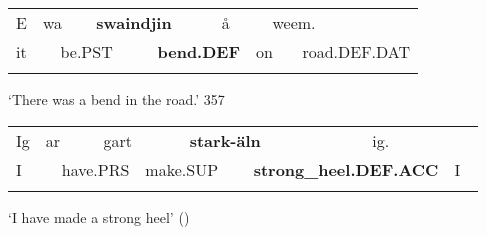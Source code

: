 \begin{tabular}{llllllllll}
\lsptoprule
E & \multicolumn{2}{l}{wa

} & \multicolumn{2}{l}{{\bfseries swaindjin}

} & \multicolumn{2}{l}{å

} & \multicolumn{2}{l}{weem.

} & \\
\multicolumn{2}{l}{it

} & \multicolumn{2}{l}{be.PST

} & \multicolumn{2}{l}{{\bfseries bend.DEF}

} & \multicolumn{2}{l}{on

} & \multicolumn{2}{l}{road.DEF.DAT

}\\
\lspbottomrule
\end{tabular}

\begin{styleTranslation}
‘There was a bend in the road.’ 357

\end{styleTranslation}


\begin{listWWNumileveli}
\item 

\end{listWWNumileveli}

\begin{tabular}{llllllllll}
\lsptoprule
Ig & \multicolumn{2}{l}{ar

} & \multicolumn{2}{l}{gart

} & \multicolumn{2}{l}{{\bfseries stark-äln}

} & \multicolumn{2}{l}{ig.

} & \\
\multicolumn{2}{l}{I 

} & \multicolumn{2}{l}{have.PRS

} & \multicolumn{2}{l}{make.SUP

} & \multicolumn{2}{l}{{\bfseries strong\_heel.DEF.ACC}

} & \multicolumn{2}{l}{I

}\\
\lspbottomrule
\end{tabular}

\begin{styleTranslation}
‘I have made a strong heel’ (\citet[95]{Levander1909})

\end{styleTranslation}

